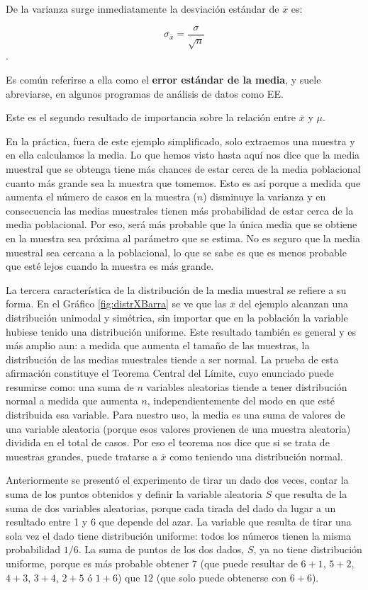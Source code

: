 \documentclass[]{book}
\begin{document}
De la varianza surge inmediatamente la desviación estándar de
\(\overline{x}\) es:

\[\sigma_{\overline{x}} = \frac{\sigma}{\sqrt{n}}\].

Es común referirse a ella como el \textbf{error estándar de la media}, y
suele abreviarse, en algunos programas de análisis de datos como EE.

Este es el segundo resultado de importancia sobre la relación entre
\(\overline{x}\) y \(\mu\).

En la práctica, fuera de este ejemplo simplificado, solo extraemos una
muestra y en ella calculamos la media. Lo que hemos visto hasta aquí nos
dice que la media muestral que se obtenga tiene más chances de estar
cerca de la media poblacional cuanto más grande sea la muestra que
tomemos. Esto es así porque a medida que aumenta el número de casos en
la muestra (\(n\)) disminuye la varianza y en consecuencia las medias
muestrales tienen más probabilidad de estar cerca de la media
poblacional. Por eso, será más probable que la única media que se
obtiene en la muestra sea próxima al parámetro que se estima. No es
seguro que la media muestral sea cercana a la poblacional, lo que se
sabe es que es menos probable que esté lejos cuando la muestra es más
grande.

La tercera característica de la distribución de la media muestral se
refiere a su forma. En el Gráfico \ref{fig:distrXBarra} se ve que las \(\overline{x}\) del
ejemplo alcanzan una distribución unimodal y simétrica, sin importar que
en la población la variable hubiese tenido una distribución uniforme.
Este resultado también es general y es más amplio aun: a medida que
aumenta el tamaño de las muestras, la distribución de las medias
muestrales tiende a ser normal. La prueba de esta afirmación constituye
el Teorema Central del Límite, cuyo enunciado puede resumirse como: una
suma de \(n\) variables aleatorias tiende a tener distribución normal a
medida que aumenta \(n\), independientemente del modo en que esté
distribuida esa variable. Para nuestro uso, la media es una suma de
valores de una variable aleatoria (porque esos valores provienen de una
muestra aleatoria) dividida en el total de casos. Por eso el teorema nos dice que si se trata de muestras grandes, puede tratarse a
\(\overline{x}\) como teniendo una distribución normal.

Anteriormente se presentó el experimento de tirar un dado dos veces,
contar la suma de los puntos obtenidos y definir la variable aleatoria
\(S\) que resulta de la suma de dos variables aleatorias, porque cada
tirada del dado da lugar a un resultado entre 1 y 6 que depende del
azar. La variable que resulta de tirar una sola vez el dado tiene
distribución uniforme: todos los números tienen la misma probabilidad
\(1/6\). La suma de puntos de los dos dados, \(S\), ya no tiene distribución uniforme, porque es más probable obtener \(7\) (que puede resultar de \(6+1\), \(5+2\), \(4+3\), \(3+4\), \(2+5\) ó \(1+6\)) que \(12\) (que solo puede obtenerse con \(6+6\)).
\end{document}
